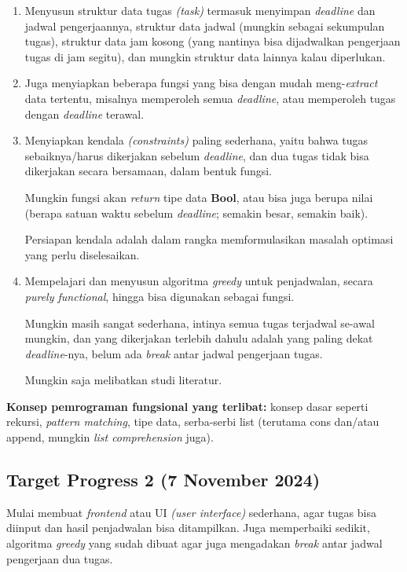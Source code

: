 \documentclass{article}
\begin{document}
\begin{enumerate}
    \item Menyusun struktur data tugas \textit{(task)} termasuk menyimpan \textit{deadline} dan jadwal pengerjaannya, struktur data jadwal (mungkin sebagai sekumpulan tugas), struktur data jam kosong (yang nantinya bisa dijadwalkan pengerjaan tugas di jam segitu), dan mungkin struktur data lainnya kalau diperlukan.
    \item Juga menyiapkan beberapa fungsi yang bisa dengan mudah meng-\textit{extract} data tertentu, misalnya memperoleh semua \textit{deadline}, atau memperoleh tugas dengan \textit{deadline} terawal.

    \item Menyiapkan kendala \textit{(constraints)} paling sederhana, yaitu bahwa tugas sebaiknya/harus dikerjakan sebelum \textit{deadline}, dan dua tugas tidak bisa dikerjakan secara bersamaan, dalam bentuk fungsi.
    
    Mungkin fungsi akan \textit{return} tipe data \textbf{Bool}, atau bisa juga berupa nilai (berapa satuan waktu sebelum \textit{deadline}; semakin besar, semakin baik).

    Persiapan kendala adalah dalam rangka memformulasikan masalah optimasi yang perlu diselesaikan.

    \item Mempelajari dan menyusun algoritma \textit{greedy} untuk penjadwalan, secara \textit{purely functional}, hingga bisa digunakan sebagai fungsi.
    
    Mungkin masih sangat sederhana, intinya semua tugas terjadwal se-awal mungkin, dan yang dikerjakan terlebih dahulu adalah yang paling dekat \textit{deadline}-nya, belum ada \textit{break} antar jadwal pengerjaan tugas.

    Mungkin saja melibatkan studi literatur.
\end{enumerate}

\textbf{Konsep pemrograman fungsional yang terlibat:} konsep dasar seperti rekursi, \textit{pattern matching}, tipe data, serba-serbi list (terutama cons dan/atau append, mungkin \textit{list comprehension} juga).

\subsection*{Target Progress 2 (7 November 2024)}

Mulai membuat \textit{frontend} atau UI \textit{(user interface)} sederhana, agar tugas bisa diinput dan hasil penjadwalan bisa ditampilkan. Juga memperbaiki sedikit, algoritma \textit{greedy} yang sudah dibuat agar juga mengadakan \textit{break} antar jadwal pengerjaan dua tugas.
\end{document}
